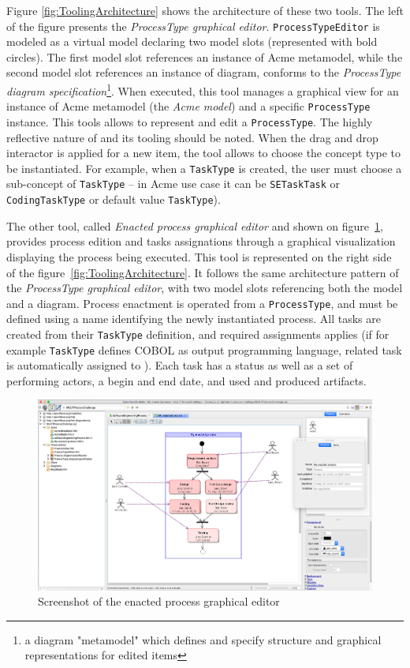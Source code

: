 Figure \ref{fig:ToolingArchitecture} shows the architecture of these two tools. The left of the figure presents the \textit{ProcessType graphical editor}. \texttt{ProcessTypeEditor} is modeled as a virtual model declaring two model slots (represented with bold circles). The first model slot references an instance of Acme metamodel, while the second model slot references an instance of diagram, conforms to the \textit{ProcessType diagram specification}\footnote{a diagram "metamodel" which defines and specify structure and graphical representations for edited items}. When executed, this tool manages a graphical view for an instance of Acme metamodel (the \textit{Acme model}) and a specific \texttt{ProcessType} instance. This tools allows to represent and edit a \texttt{ProcessType}. The highly reflective nature of \FML and its tooling should be noted. When the drag and drop interactor is applied for a new item, the tool allows to choose the concept type to be instantiated. For example, when a \texttt{TaskType} is created, the user must choose a sub-concept of \texttt{TaskType} -- in Acme use case it can be \texttt{SETaskTask} or \texttt{CodingTaskType} or default value \texttt{TaskType}). 

The other tool, called \textit{Enacted process graphical editor} and shown on figure~\ref{fig:ScreenshotEnactedProcessEditor}, provides process edition and tasks assignations through a graphical visualization displaying the process being executed. This tool is represented on the right side of the figure~\ref{fig:ToolingArchitecture}. It follows the same architecture pattern of the \textit{ProcessType graphical editor}, with two model slots referencing both the model and a diagram. Process enactment is operated from a \texttt{ProcessType}, and must be defined using a name identifying the newly instantiated process. All tasks are created from their \texttt{TaskType} definition, and required assignments applies (if for example  \texttt{TaskType} defines COBOL as output programming language, related task is automatically assigned to ). Each task has a status as well as a set of performing actors, a begin and end date, and used and produced artifacts. 

\begin{figure}
 \centering
     \includegraphics[width=\textwidth]{Figures/ScreenshotEnactedProcessEditor.png}
     \caption{Screenshot of the enacted process graphical editor}
    \label{fig:ScreenshotEnactedProcessEditor}
\end{figure}




